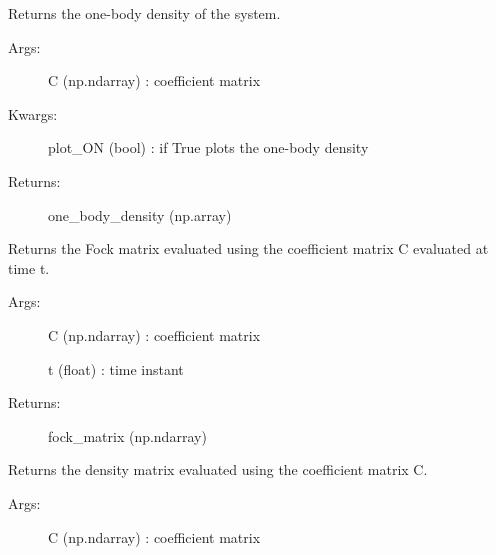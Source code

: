 \documentclass[letterpaper,10pt,english]{sphinxmanual}
\begin{document}
\begin{fulllineitems}
\begin{description}
\end{description}

\begin{fulllineitems}
\label{\detokenize{index:do.RHF.eval_one_body_density}}
Returns the one-body density of the system.
\begin{description}
\item[{Args:}] \leavevmode
C (np.ndarray) : coefficient matrix

\item[{Kwargs:}] \leavevmode
plot\_ON (bool) : if True plots the one-body density

\item[{Returns:}] \leavevmode
one\_body\_density (np.array)

\end{description}

\end{fulllineitems}


\begin{fulllineitems}
\label{\detokenize{index:do.RHF.evaluate_total_energy}}
Returns the Fock matrix evaluated using the coefficient matrix C evaluated at time t.
\begin{description}
\item[{Args:}] \leavevmode
C (np.ndarray) : coefficient matrix

t (float) : time instant

\item[{Returns:}] \leavevmode
fock\_matrix (np.ndarray)

\end{description}

\end{fulllineitems}


\begin{fulllineitems}
\label{\detokenize{index:do.RHF.fill_density_matrix}}
Returns the density matrix evaluated using the coefficient matrix C.
\begin{description}
\item[{Args:}] \leavevmode
C (np.ndarray) : coefficient matrix


\end{description}
\end{fulllineitems}
\end{fulllineitems}
\end{document}
